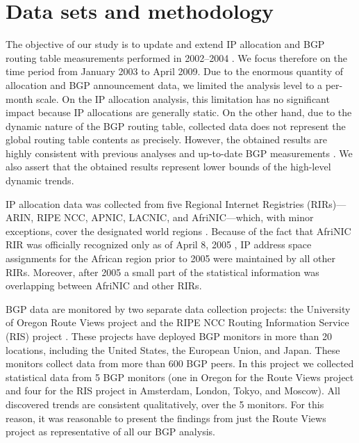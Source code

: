 \section{Data sets and methodology}
\label{sec:data sets}

The objective of our study is to update and extend IP allocation and BGP
routing table measurements performed in 2002--2004
\cite{Meng:2003:An-analysis-of-BGP-routing} \cite{Xu:2003:IPv4-Address}
\cite{Meng:2005:IPv4-address}. We focus therefore on the time period from
January 2003 to April 2009. Due to the enormous quantity of allocation and BGP
announcement data, we limited the analysis level to a per-month scale. On the
IP allocation analysis, this limitation has no significant impact because IP
allocations are generally static. On the other hand, due to the dynamic nature
of the BGP routing table, collected data does not represent the global routing
table contents as precisely. However, the obtained results are highly
consistent with previous analyses \cite{Meng:2005:IPv4-address} and up-to-date
BGP measurements \cite{::IPv4-Address-Report}. We also assert that the obtained
results represent lower bounds of the high-level dynamic trends.


IP allocation data was collected from five Regional Internet Registries
(RIRs)---ARIN, RIPE NCC, APNIC, LACNIC, and AfriNIC---which, with minor
exceptions, cover the designated world regions \cite{::IANA----Number}. Because
of the fact that AfriNIC RIR was officially recognized only as of April 8, 2005
\cite{AKPLOGAN:2005:AfriNIC-now-officially}, IP address space assignments for
the African region prior to 2005 were maintained by all other RIRs. Moreover,
after 2005 a small part of the statistical information was overlapping between
AfriNIC and other RIRs.

BGP data are monitored by two separate data collection projects: the University
of Oregon Route Views project \cite{::Route-Views} and the RIPE NCC Routing
Information Service (RIS) project \cite{::RIS}. These projects have deployed
BGP monitors in more than 20 locations, including the United States, the
European Union, and Japan. These monitors collect data from more than 600 BGP
peers. In this project we collected statistical data from 5 BGP monitors (one
in Oregon for the Route Views project and four for the RIS project in
Amsterdam, London, Tokyo, and Moscow). All discovered trends are consistent
qualitatively, over the 5 monitors. For this reason, it was reasonable to
present the findings from just the Route Views project as representative of all
our BGP analysis.

